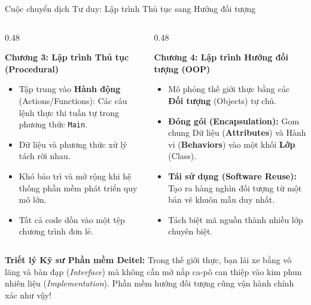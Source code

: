 \documentclass[aspectratio=169, 10pt]{beamer}
\begin{document}
\begin{frame}{Cuộc chuyển dịch Tư duy: Lập trình Thủ tục sang Hướng đối tượng}
  \begin{columns}[T]
    \begin{column}{0.48\textwidth}
      \begin{block}{\textbf{Chương 3: Lập trình Thủ tục (Procedural)}}
        \begin{itemize}\small
          \item Tập trung vào \textbf{Hành động} (Actions/Functions): Các câu lệnh thực thi tuần tự trong phương thức \texttt{Main}.
          \item Dữ liệu và phương thức xử lý tách rời nhau.
          \item Khó bảo trì và mở rộng khi hệ thống phần mềm phát triển quy mô lớn.
          \item Tất cả code dồn vào một tệp chương trình đơn lẻ.
        \end{itemize}
      \end{block}
    \end{column}

    \begin{column}{0.48\textwidth}
      \begin{exampleblock}{\textbf{Chương 4: Lập trình Hướng đối tượng (OOP)}}
        \begin{itemize}\small
          \item Mô phỏng thế giới thực bằng các \textbf{Đối tượng} (Objects) tự chủ.
          \item \textbf{Đóng gói (Encapsulation):} Gom chung Dữ liệu (\textbf{Attributes}) và Hành vi (\textbf{Behaviors}) vào một khối \textbf{Lớp} (Class).
          \item \textbf{Tái sử dụng (Software Reuse):} Tạo ra hàng nghìn đối tượng từ một bản vẽ khuôn mẫu duy nhất.
          \item Tách biệt mã nguồn thành nhiều lớp chuyên biệt.
        \end{itemize}
      \end{exampleblock}
    \end{column}
  \end{columns}
  \vspace{2mm}
  \begin{alertblock}{\textbf{Triết lý Kỹ sư Phần mềm Deitel:}}
    Trong thế giới thực, bạn lái xe bằng vô lăng và bàn đạp (\textit{Interface}) mà không cần mở nắp ca-pô can thiệp vào kim phun nhiên liệu (\textit{Implementation}). Phần mềm hướng đối tượng cũng vận hành chính xác như vậy!
  \end{alertblock}
\end{frame}
\end{document}
